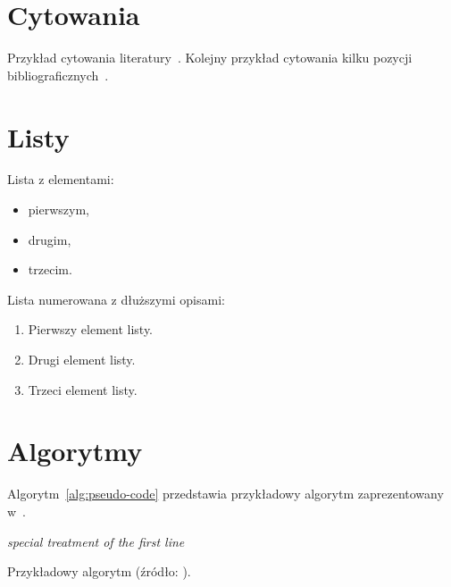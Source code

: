 \documentclass[polish]{aghengthesis}
\begin{document}
\section{Cytowania}
\label{sec:cytowania}

Przykład cytowania literatury~\cite{wilson2009prediction-interday}. Kolejny przykład
cytowania kilku pozycji bibliograficznych~\cite{allen1999using-genetic, zitzler1999evolutionary-algorithms, pictet1995genetic-algorithms, wilhelmstotter2021jenetics, chmaj2015DistributedProcessingApplications}.
\section{Listy}
\label{sec:listy}

Lista z elementami:
\begin{itemize}
\item pierwszym,
\item drugim,
\item trzecim.
\end{itemize}

Lista numerowana z dłuższymi opisami:
\begin{enumerate}
\item Pierwszy element listy.
\item Drugi element listy.
\item Trzeci element listy.
\end{enumerate}
\section{Algorytmy}
\label{sec:algorytmy}

Algorytm~\ref{alg:pseudo-code} przedstawia przykładowy algorytm zaprezentowany w~\cite{fiorio2017algorithm2e}. 

\begin{algorithm}[!htbp]
\BlankLine
\emph{special treatment of the first line}\;
  \caption[Przykładowy algorytm]{Przykładowy algorytm (źródło: \cite{fiorio2017algorithm2e}).}
  \label{alg:pseudo-code}
\end{algorithm}
\end{document}
